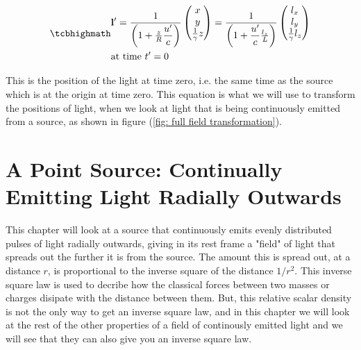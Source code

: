 \begin{equation}
	\label{eq: time synced transform}
	\mhl{
		\begin{aligned}
			& \mathbf{l}{'} = \dfrac{1}{\left(1 + \frac{z}{R} \dfrac{u'}{c} \right)}
			\begin{pmatrix}
				x                    \\
				y                    \\
				\frac{1}{{\gamma}} z \\
			\end{pmatrix}
			= \dfrac{1}{\left(1 + \dfrac{u'}{c} \frac{l_z}{L} \right)}
			\begin{pmatrix}
				l_x                    \\
				l_y                    \\
				\frac{1}{{\gamma}} l_z \\
			\end{pmatrix}
			\\
			& \text{at time ${t{'}}=0$ }
		\end{aligned}
	}
\end{equation}


This is the position of the light at time zero, i.e. the same time as the source which is at the origin at time zero. This equation is what we will use to transform the positions of light, when we look at light that is being continuously emitted from a source, as shown in figure (\ref{fig: full field transformation}).



\printbibliography[segment=\therefsegment, heading=subbibliography]

\chapter{A Point Source: Continually Emitting Light Radially Outwards} \label{ch: A Point Source Continually Emitting Light}

This chapter will look at a source that continuously emits evenly distributed pulses of light radially outwards, giving in its rest frame a "field" of light that spreads out the further it is from the source.
The amount this is spread out, at a distance $r$, is proportional to the inverse square of the distance $1/r^2$.
This inverse square law is used to decribe how the classical forces between two masses or charges disipate with the distance between them.
But, this relative scalar density is not the only way to get an inverse square law, and in this chapter we will look at the rest of the other properties of a field of continously emitted light and we will see that they can also give you an inverse square law.

